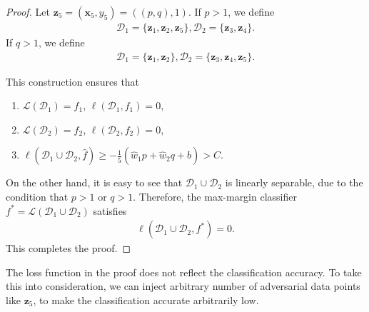 \begin{proof}
    Let $\boldsymbol{z}_5 = (\boldsymbol{x}_5, y_5) = ((p, q), 1)$. 
    If $p>1$, we define 
    \begin{align*}
        \mathcal{D}_1 = \{\boldsymbol{z}_1, \boldsymbol{z}_2, \boldsymbol{z}_5\}, \mathcal{D}_2 = \{\boldsymbol{z}_3, \boldsymbol{z}_4\}.
    \end{align*}
    If $q>1$, we define 
    \begin{align*}
        \mathcal{D}_1 = \{\boldsymbol{z}_1, \boldsymbol{z}_2\}, \mathcal{D}_2 = \{\boldsymbol{z}_3, \boldsymbol{z}_4, \boldsymbol{z}_5\}.
    \end{align*}

    This construction ensures that 
    \begin{enumerate}
    \setlength{\itemsep}{0pt} %
    \item $\mathcal{L}(\mathcal{D}_1) = f_1$, $\ell(\mathcal{D}_1, f_1) = 0$, 
    \item $\mathcal{L}(\mathcal{D}_2) = f_2$, $\ell(\mathcal{D}_2, f_2) = 0$,
    \item $\ell(\mathcal{D}_1\cup \mathcal{D}_2, \hat{f})\ge -\frac{1}{5}\left(\hat{w}_1 p + \hat{w}_2 q + \hat{b}\right)> C$.
    \end{enumerate}

    On the other hand, it is easy to see that $\mathcal{D}_1\cup \mathcal{D}_2$ is linearly separable, due to the condition that $p>1$ or $q>1$. Therefore, the max-margin classifier $f^* = \mathcal{L}(\mathcal{D}_1\cup \mathcal{D}_2)$ satisfies
    \begin{align*}
        \ell(\mathcal{D}_1\cup \mathcal{D}_2, f^*) = 0.
    \end{align*}
    This completes the proof. 
\end{proof}




    


\begin{remark}
    The loss function in the proof does not reflect the classification accuracy. To take this into consideration, 
    we can inject arbitrary number of adversarial data points like $\boldsymbol{z}_5$, to make the classification accurate arbitrarily low.
\end{remark}